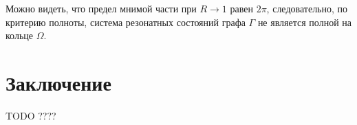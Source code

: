 \documentclass{nsart_eng}
\begin{document}
Можно видеть, что предел мнимой части при $R \to 1$ равен $2 \pi$, следовательно, по критерию полноты, система резонатных состояний графа $\Gamma$ не является полной на кольце $\Omega$.





\section{Заключение}
TODO ????

\end{document}
